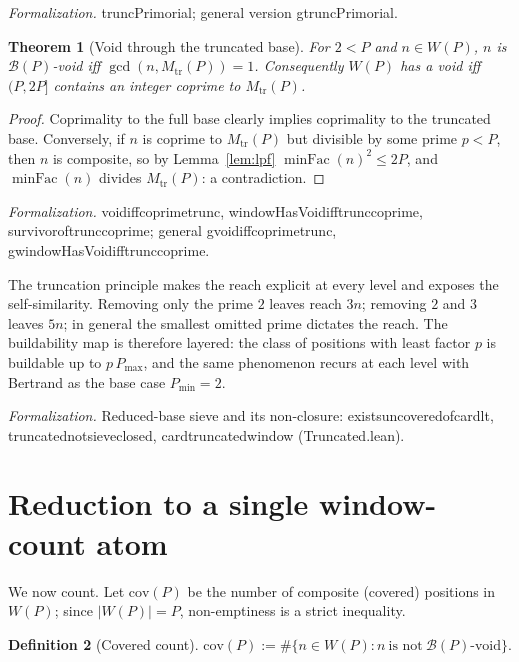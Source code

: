 \documentclass[11pt,a4paper]{amsart}
\theoremstyle{plain}
\newtheorem{theorem}{Theorem}[section]
\theoremstyle{definition}
\newtheorem{definition}[theorem]{Definition}
\theoremstyle{plain}
\theoremstyle{remark}
\newcommand{\lean}[1]{\begingroup\upshape\ttfamily\def\_{\textunderscore\allowbreak}#1\endgroup}
\newcommand{\Formal}[1]{\par\smallskip\noindent\begingroup\raggedright\emph{Formalization.} #1\par\endgroup\smallskip}
\begin{document}
\Formal{\lean{truncPrimorial}; general version \lean{gtruncPrimorial}.}

\begin{theorem}[Void through the truncated base]\label{thm:trunc}
For $2<P$ and $n\in W(P)$, $n$ is $\mathcal{B}(P)$-void iff $\gcd(n,M_{\mathrm{tr}}(P))=1$.
Consequently $W(P)$ has a void iff $(P,2P]$ contains an integer coprime to
$M_{\mathrm{tr}}(P)$.
\end{theorem}

\begin{proof}
Coprimality to the full base clearly implies coprimality to the truncated base. Conversely,
if $n$ is coprime to $M_{\mathrm{tr}}(P)$ but divisible by some prime $p<P$, then $n$ is
composite, so by Lemma~\ref{lem:lpf} $\operatorname{minFac}(n)^2\le 2P$, and
$\operatorname{minFac}(n)$ divides $M_{\mathrm{tr}}(P)$: a contradiction.
\end{proof}

\Formal{\lean{void\_iff\_coprime\_trunc}, \lean{windowHasVoid\_iff\_trunc\_coprime},
\lean{survivor\_of\_trunc\_coprime}; general \lean{gvoid\_iff\_coprime\_trunc},
\lean{gwindowHasVoid\_iff\_trunc\_coprime}.}

The truncation principle makes the reach explicit at every level and exposes the
self-similarity. Removing only the prime $2$ leaves reach $3n$; removing $2$ and $3$ leaves
$5n$; in general the smallest omitted prime dictates the reach. The buildability map is
therefore layered: the class of positions with least factor $p$ is buildable up to
$p\,P_{\max}$, and the same phenomenon recurs at each level with Bertrand as the base case
$P_{\min}=2$.

\Formal{Reduced-base sieve and its non-closure:
\lean{exists\_uncovered\_of\_card\_lt}, \lean{truncated\_not\_sieve\_closed},
\lean{card\_truncated\_window} (\lean{Truncated.lean}).}

\section{Reduction to a single window-count atom}
\label{sec:atom}

We now count. Let $\mathrm{cov}(P)$ be the number of composite (covered) positions in
$W(P)$; since $|W(P)|=P$, non-emptiness is a strict inequality.

\begin{definition}[Covered count]
$\mathrm{cov}(P):=\#\{n\in W(P): n\ \text{is not}\ \mathcal{B}(P)\text{-void}\}.$
\end{definition}
\end{document}
